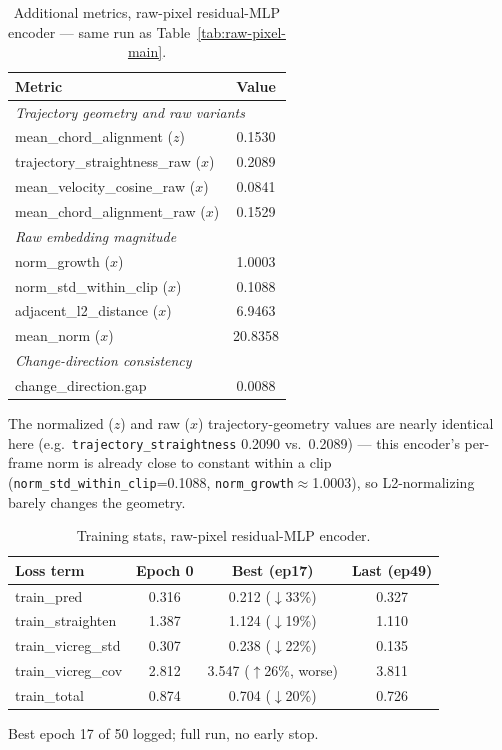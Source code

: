 \begin{table}[H]
\centering
\caption{Additional metrics, raw-pixel residual-MLP encoder --- same run as
Table~\ref{tab:raw-pixel-main}.}
\label{tab:raw-pixel-additional}
\begin{tabular}{lc}
\toprule
Metric & Value \\
\midrule
\multicolumn{2}{l}{\textit{Trajectory geometry and raw variants}} \\
mean\_chord\_alignment ($z$) & 0.1530 \\
trajectory\_straightness\_raw ($x$) & 0.2089 \\
mean\_velocity\_cosine\_raw ($x$) & 0.0841 \\
mean\_chord\_alignment\_raw ($x$) & 0.1529 \\
\midrule
\multicolumn{2}{l}{\textit{Raw embedding magnitude}} \\
norm\_growth ($x$) & 1.0003 \\
norm\_std\_within\_clip ($x$) & 0.1088 \\
adjacent\_l2\_distance ($x$) & 6.9463 \\
mean\_norm ($x$) & 20.8358 \\
\midrule
\multicolumn{2}{l}{\textit{Change-direction consistency}} \\
change\_direction.gap & 0.0088 \\
\bottomrule
\end{tabular}

\vspace{0.3em}
{\footnotesize The normalized ($z$) and raw ($x$) trajectory-geometry values are nearly
identical here (e.g.\ \texttt{trajectory\_straightness} 0.2090 vs.\ 0.2089) --- this
encoder's per-frame norm is already close to constant within a clip
(\texttt{norm\_std\_within\_clip}=0.1088, \texttt{norm\_growth}$\approx$1.0003), so
L2-normalizing barely changes the geometry.}
\end{table}

\begin{table}[H]
\centering
\caption{Training stats, raw-pixel residual-MLP encoder.}
\label{tab:raw-pixel-training}
\begin{tabular}{lccc}
\toprule
Loss term & Epoch 0 & Best (ep17) & Last (ep49) \\
\midrule
train\_pred & 0.316 & 0.212 ($\downarrow$33\%) & 0.327 \\
train\_straighten & 1.387 & 1.124 ($\downarrow$19\%) & 1.110 \\
train\_vicreg\_std & 0.307 & 0.238 ($\downarrow$22\%) & 0.135 \\
train\_vicreg\_cov & 2.812 & 3.547 ($\uparrow$26\%, worse) & 3.811 \\
train\_total & 0.874 & 0.704 ($\downarrow$20\%) & 0.726 \\
\bottomrule
\end{tabular}

\vspace{0.3em}
{\footnotesize Best epoch 17 of 50 logged; full run, no early stop.}
\end{table}

